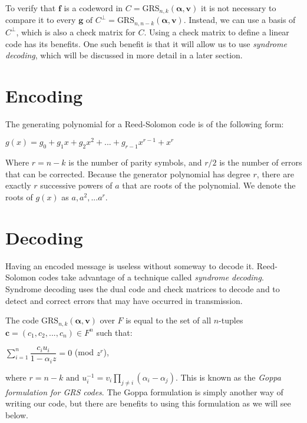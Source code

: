 \documentclass{article}
\begin{document}
To verify that $\textbf{f}$ is a codeword in $C = \text{GRS}_{n,k}(\boldsymbol\alpha, \textbf{v})$ it is not necessary to compare it to every $\textbf{g} \text{ of } C^{\perp} = \text{GRS}_{n,n-k}(\boldsymbol\alpha, \textbf{v})$. Instead, we can use a basis of $C^{\perp}$, which is also a check matrix for $C$. Using a check matrix to define a linear code has its benefits. One such benefit is that it will allow us to use \textit{syndrome decoding}, which will be discussed in more detail in a later section.

\section{Encoding}
The generating polynomial for a Reed-Solomon code is of the following form:
\begin{center}
$g(x) = g_{0} + g_{1}x + g_{2}x^{2} + ... + g_{r - 1}x^{r - 1} + x^{r}$
\end{center}
Where $r = n - k$ is the number of parity symbols, and $r/2$ is the number of errors that can be corrected. Because the generator polynomial has degree $r$, there are exactly $r$ successive powers of $a$ that are roots of the polynomial. We denote the roots of $g(x)$ as $a, a^{2},...a^{r}$.

\section{Decoding}
Having an encoded message is useless without someway to decode it. Reed-Solomon codes take advantage of a technique called \textit{syndrome decoding}. Syndrome decoding uses the dual code and check matrices to decode and to detect and correct errors that may have occurred in transmission. 

The code $\text{GRS}_{n,k}(\boldsymbol\alpha, \textbf{v})$ over $F$ is equal to the set of all $n$-tuples $\textbf{c} = (c_{1},c_{2},...,c_{n}) \in F^{n}$ such that:
\begin{center}
$\sum\limits_{i = 1}^{n} \dfrac{c_{i}u_{i}}{1 - \alpha_{i}z} = 0$ (mod $z^{r}$),
\end{center}
where $r = n - k \text{ and } u_{i}^{-1} = v_{i}\prod\limits_{j \neq i} (\alpha_{i} - \alpha_{j})$. This is known as the \textit{Goppa formulation for GRS codes}. The Goppa formulation is simply another way of writing our code, but there are benefits to using this formulation as we will see below.
\end{document}

